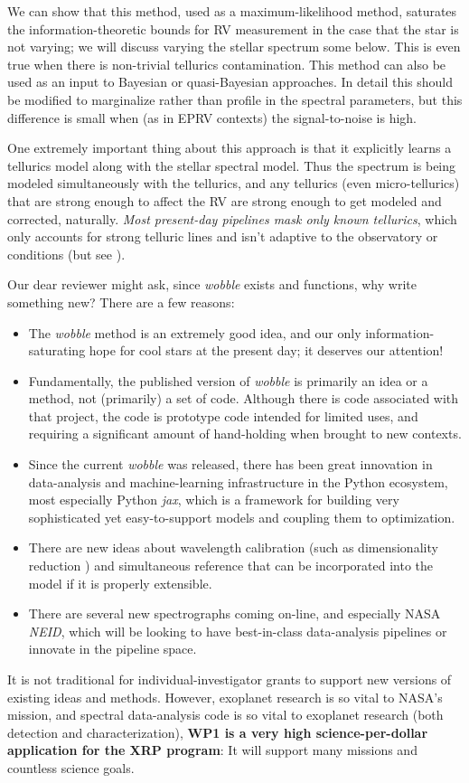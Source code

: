 \documentclass[12pt]{article}
\begin{document}
We can show that this method, used as a maximum-likelihood method, saturates the information-theoretic bounds for RV measurement in the case that the star is not varying; we will discuss varying the stellar spectrum some below.
This is even true when there is non-trivial tellurics contamination.
This method can also be used as an input to Bayesian or quasi-Bayesian approaches.
In detail this should be modified to marginalize rather than profile in the spectral parameters, but this difference is small when (as in EPRV contexts) the signal-to-noise is high.

One extremely important thing about this approach is that it explicitly learns a tellurics model along with the stellar spectral model.
Thus the spectrum is being modeled simultaneously with the tellurics, and any tellurics (even micro-tellurics) that are strong enough to affect the RV are strong enough to get modeled and corrected, naturally.
\emph{Most present-day pipelines mask only known tellurics}, which only accounts for strong telluric lines and isn't adaptive to the observatory or conditions (but see \cite{telluricPCA}).

Our dear reviewer might ask, since \textsl{wobble} exists and functions, why write something new?
There are a few reasons:
\begin{itemize}
    \item The \textsl{wobble} method is an extremely good idea, and our only information-saturating hope for cool stars at the present day; it deserves our attention!
    \item Fundamentally, the published version of \textsl{wobble} is primarily an idea or a method, not (primarily) a set of code. Although there is code associated with that project, the code is prototype code intended for limited uses, and requiring a significant amount of hand-holding when brought to new contexts.
    \item Since the current \textsl{wobble} was released, there has been great innovation in data-analysis and machine-learning infrastructure in the Python ecosystem, most especially Python \textsl{jax}, which is a framework for building very sophisticated yet easy-to-support models and coupling them to optimization.
    \item There are new ideas about wavelength calibration (such as dimensionality reduction \cite{excalibur}) and simultaneous reference that can be incorporated into the model if it is properly extensible.
    \item There are several new spectrographs coming on-line, and especially NASA \textsl{NEID}, which will be looking to have best-in-class data-analysis pipelines or innovate in the pipeline space.
\end{itemize}
It is not traditional for individual-investigator grants to support new versions of existing ideas and methods.
However, exoplanet research is so vital to NASA's mission, and spectral data-analysis code is so vital to exoplanet research (both detection and characterization), \textbf{WP1 is a very high science-per-dollar application for the XRP program}:
It will support many missions and countless science goals.
\end{document}
